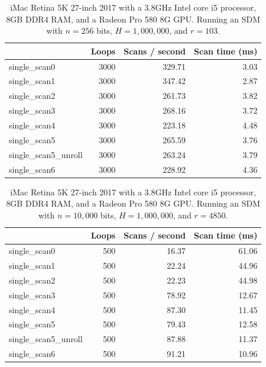 \begin{table}[!htb]
\centering
\begin{tabular}{| l | r | r | r |}
    \hline
    & Loops & Scans / second & Scan time (ms) \\ \hline
    single\_scan0 & 3000 & 329.71 & 3.03 \\
    single\_scan1 & 3000 & 347.42 & 2.87 \\
    single\_scan2 & 3000 & 261.73 & 3.82 \\
    single\_scan3 & 3000 & 268.16 & 3.72 \\
    single\_scan4 & 3000 & 223.18 & 4.48 \\
    single\_scan5 & 3000 & 265.59 & 3.76 \\
    single\_scan5\_unroll & 3000 & 263.24 & 3.79 \\
    single\_scan6 & 3000 & 228.92 & 4.36 \\
    \hline
\end{tabular}
\caption{iMac Retina 5K 27-inch 2017 with a 3.8GHz Intel core i5 processor, 8GB DDR4 RAM, and a Radeon Pro 580 8G GPU. Running an SDM with $n=256$ bits, $H=1,000,000$, and $r=103$.
\label{tab:perf-imac-kernels-256}}
\end{table}

\begin{table}[!htb]
\centering
\begin{tabular}{| l | r | r | r |}
    \hline
    & Loops & Scans / second & Scan time (ms) \\ \hline
    single\_scan0 & 500 & 16.37 & 61.06 \\
    single\_scan1 & 500 & 22.24 & 44.96 \\
    single\_scan2 & 500 & 22.23 & 44.98 \\
    single\_scan3 & 500 & 78.92 & 12.67 \\
    single\_scan4 & 500 & 87.30 & 11.45 \\
    single\_scan5 & 500 & 79.43 & 12.58 \\
    single\_scan5\_unroll & 500 & 87.88 & 11.37 \\
    single\_scan6 & 500 & 91.21 & 10.96 \\
    \hline
\end{tabular}
\caption{iMac Retina 5K 27-inch 2017 with a 3.8GHz Intel core i5 processor, 8GB DDR4 RAM, and a Radeon Pro 580 8G GPU. Running an SDM with $n=10,000$ bits, $H=1,000,000$, and $r=4850$.
\label{tab:perf-imac-kernels-10k}}
\end{table}

